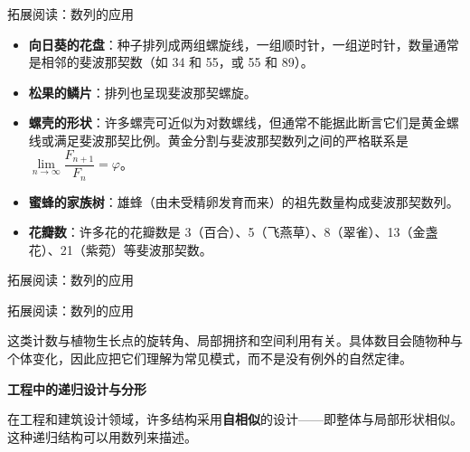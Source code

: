 \documentclass[aspectratio=169,10pt,fontset=fandol]{ctexbeamer}
\begin{document}
\begin{frame}[t,fragile]{拓展阅读：数列的应用}
\normalsize
{\normalsize
\begin{itemize}

\item \textbf{向日葵的花盘}：种子排列成两组螺旋线，一组顺时针，一组逆时针，数量通常是相邻的斐波那契数（如 34 和 55，或 55 和 89）。

\item \textbf{松果的鳞片}：排列也呈现斐波那契螺旋。

\item \textbf{螺壳的形状}：许多螺壳可近似为对数螺线，但通常不能据此断言它们是黄金螺线或满足斐波那契比例。黄金分割与斐波那契数列之间的严格联系是 \(\lim\limits_{n \to \infty} \dfrac{F_{n+1}}{F_n}=\varphi\)。

\item \textbf{蜜蜂的家族树}：雄蜂（由未受精卵发育而来）的祖先数量构成斐波那契数列。

\item \textbf{花瓣数}：许多花的花瓣数是 3（百合）、5（飞燕草）、8（翠雀）、13（金盏花）、21（紫菀）等斐波那契数。

\end{itemize}
}
\end{frame}
\begin{frame}[t,fragile]{拓展阅读：数列的应用}
\normalsize
{\normalsize
\begin{center}


\end{center}
}
\end{frame}
\begin{frame}[t,fragile]{拓展阅读：数列的应用}
\normalsize
{\normalsize




这类计数与植物生长点的旋转角、局部拥挤和空间利用有关。具体数目会随物种与个体变化，因此应把它们理解为常见模式，而不是没有例外的自然定律。





\textbf{工程中的递归设计与分形}



在工程和建筑设计领域，许多结构采用\textbf{自相似}的设计——即整体与局部形状相似。这种递归结构可以用数列来描述。




}
\end{frame}
\end{document}
